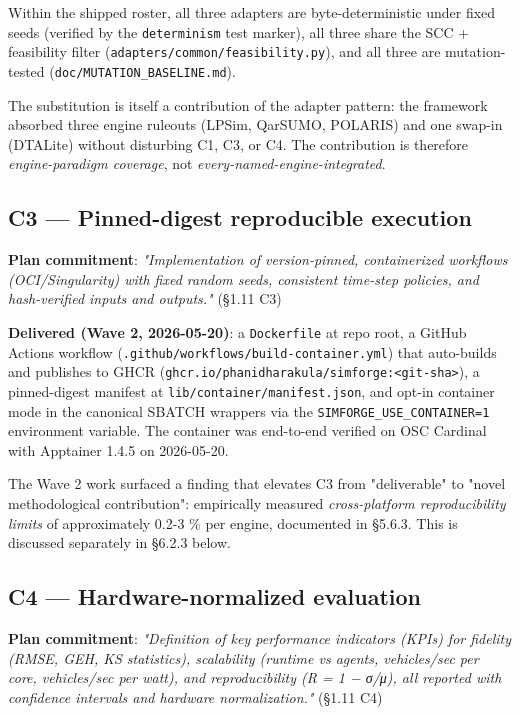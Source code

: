 Within the shipped roster, all three adapters are byte-deterministic
under fixed seeds (verified by the \texttt{determinism} test marker),
all three share the SCC + feasibility filter
(\texttt{adapters/common/feasibility.py}), and all three are
mutation-tested (\texttt{doc/MUTATION\_BASELINE.md}).

The substitution is itself a contribution of the adapter pattern: the
framework absorbed three engine ruleouts (LPSim, QarSUMO, POLARIS) and
one swap-in (DTALite) without disturbing C1, C3, or C4. The contribution
is therefore \emph{engine-paradigm coverage}, not
\emph{every-named-engine-integrated}.

\subsection{C3 --- Pinned-digest reproducible
execution}\label{613-c3--pinned-digest-reproducible-execution}

\textbf{Plan commitment}: \emph{"Implementation of version-pinned,
containerized workflows (OCI/Singularity) with fixed random seeds,
consistent time-step policies, and hash-verified inputs and outputs."}
(§1.11 C3)

\textbf{Delivered (Wave 2, 2026-05-20)}: a \texttt{Dockerfile} at repo
root, a GitHub Actions workflow
(\texttt{.github/workflows/build-container.yml}) that auto-builds and
publishes to GHCR
(\texttt{ghcr.io/phanidharakula/simforge:\textless{}git-sha\textgreater{}}),
a pinned-digest manifest at \texttt{lib/container/manifest.json}, and
opt-in container mode in the canonical SBATCH wrappers via the
\texttt{SIMFORGE\_USE\_CONTAINER=1} environment variable. The container
was end-to-end verified on OSC Cardinal with Apptainer 1.4.5 on
2026-05-20.

The Wave 2 work surfaced a finding that elevates C3 from "deliverable"
to "novel methodological contribution": empirically measured
\emph{cross-platform reproducibility limits} of approximately 0.2-3 \%
per engine, documented in §5.6.3. This is discussed separately in §6.2.3
below.

\subsection{C4 --- Hardware-normalized
evaluation}\label{614-c4--hardware-normalized-evaluation}

\textbf{Plan commitment}: \emph{"Definition of key performance
indicators (KPIs) for fidelity (RMSE, GEH, KS statistics), scalability
(runtime vs agents, vehicles/sec per core, vehicles/sec per watt), and
reproducibility (R = 1 − σ/μ), all reported with confidence intervals
and hardware normalization."} (§1.11 C4)

